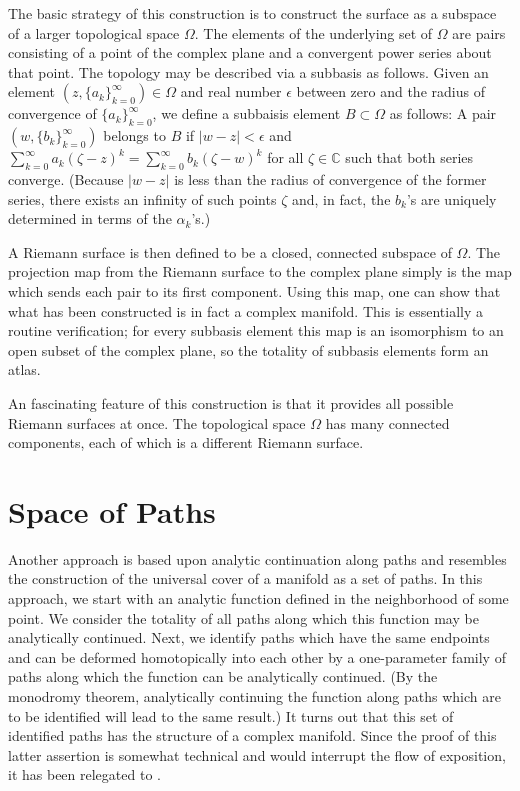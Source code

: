 \documentclass[12pt]{article}
\begin{document}
The basic strategy of this construction is to construct the surface as a
subspace of a larger topological space $\Omega$.  The elements of the 
underlying set of $\Omega$ are pairs consisting of a point of the
complex plane and a convergent power series about that point.  The 
topology may be described via a subbasis as follows.  Given an element
$(z,\{a_k\}_{k=0}^\infty) \in \Omega$ and real number $\epsilon$ 
between zero and the radius of convergence of $\{a_k\}_{k=0}^\infty$,
we define a subbaisis element $B \subset \Omega$ as follows: 
A pair $(w,\{b_k\}_{k=0}^\infty)$ belongs to $B$ if $|w - z| 
< \epsilon$ and $\sum_{k=0}^\infty a_k (\zeta - z)^k = \sum_{k=0}^\infty 
b_k (\zeta - w)^k$ for all $\zeta \in \mathbb{C}$ such that both series 
converge.  (Because $|w-z|$ is less than the radius of convergence of
the former series, there exists an infinity of such points $\zeta$ and,
in fact, the $b_k$'s are uniquely determined in terms of the $\alpha_k$'s.)

A Riemann surface is then defined to be a closed, connected subspace of
$\Omega$.  The projection map from the Riemann surface to the complex
plane simply is the map which sends each pair to its first component.
Using this map, one can show that what has been constructed is in fact
a complex manifold.  This is essentially a routine verification; for
every subbasis element this map is an isomorphism to an open subset of
the complex plane, so the totality of subbasis elements form an atlas.

An fascinating feature of this construction is that it provides all
possible Riemann surfaces at once.  The topological space $\Omega$ 
has many connected components, each of which is a different 
Riemann surface.

\section{Space of Paths}
Another approach is based upon analytic continuation along paths and 
resembles the construction of the universal cover of a manifold as a 
set of paths.  In this approach, we start with an analytic function defined
in the neighborhood of some point.  We consider the totality of all paths
along which this function may be analytically continued.  Next, we identify
paths which have the same endpoints and can be deformed homotopically
into each other by a one-parameter family of paths along which the 
function can be analytically continued.  (By the monodromy theorem,
analytically continuing the function along paths which are to be 
identified will lead to the same result.)  It turns out that this set
of identified paths has the structure of a complex manifold.  Since the
proof of this latter assertion is somewhat technical and would interrupt
the flow of exposition, it has been relegated to .
\end{document}
